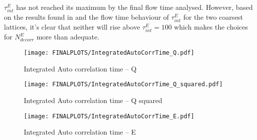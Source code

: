\documentclass[a4paper,10pt]{book}
\begin{document}
$\tau_{int}^E$ has not reached its maximum by the final flow time analysed. However, based on the results found in \cite{non_gaussianities2015} and the flow time behaviour of $\tau_{int}^E$ for the two coarsest lattices, it's clear that neither will rise above $\tau_{int}^E=100$ which makes the choices for $N_{decorr}^E$ more than adequate.

\begin{figure}[htbp]
\centering
\texttt{[image: FINALPLOTS/IntegratedAutoCorrTime\_Q.pdf]}
\caption[]{Integrated Auto correlation time -- Q}\label{fig:intAutocorr_Q}
\end{figure}

\begin{figure}[htbp]
\centering
\texttt{[image: FINALPLOTS/IntegratedAutoCorrTime\_Q\_squared.pdf]}
\caption[]{Integrated Auto correlation time -- Q squared}\label{fig:intAutocorr_Q_squared}
\end{figure}
\begin{figure}[htbp]
\centering
\texttt{[image: FINALPLOTS/IntegratedAutoCorrTime\_E.pdf]}
\caption[]{Integrated Auto correlation time -- E}\label{fig:intAutocorr_E}
\end{figure}
\end{document}
